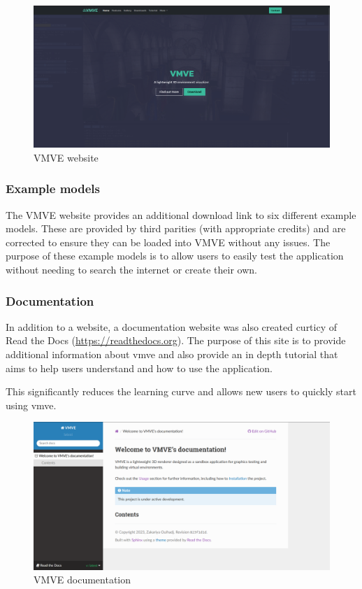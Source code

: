 \documentclass[11pt]{article}
\begin{document}
\begin{figure}[h!]
  \centering
  \includegraphics[width=\textwidth]{images/website.png}
  \caption{VMVE website}
  \label{fig:website}
\end{figure}


\subsubsection{Example models}
The VMVE website provides an additional download link to six different example
models. These are provided by third parities (with appropriate credits) and are
corrected to ensure they can be loaded into VMVE without any issues. The purpose
of these example models is to allow users to easily test the application without
needing to search the internet or create their own.


\subsubsection{Documentation}
In addition to a website, a documentation website was also created curticy of
Read the Docs (\href{https://readthedocs.org}{https://readthedocs.org}). The
purpose of this site is to provide additional information about \gls{vmve} and
also provide an in depth tutorial that aims to help users understand and how to
use the application.

This significantly reduces the learning curve and allows new users to quickly
start using \gls{vmve}.

\begin{figure}[h!]
  \centering
  \includegraphics[width=\textwidth]{images/documentation.png}
  \caption{VMVE documentation}
  \label{fig:documentation}
\end{figure}
\end{document}
